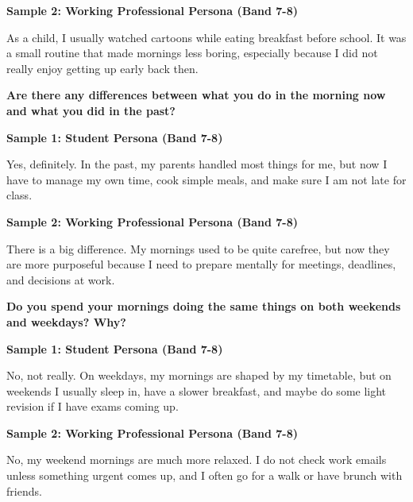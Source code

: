 \textbf{Sample 2: Working Professional Persona (Band 7-8)}

As a child, I usually watched cartoons while eating breakfast before school. It was a small routine that made mornings less boring, especially because I did not really enjoy getting up early back then.

\separator

\begin{ieltsquestion}
\textbf{Are there any differences between what you do in the morning now and what you did in the past?}
\end{ieltsquestion}
\textbf{Sample 1: Student Persona (Band 7-8)}

Yes, definitely. In the past, my parents handled most things for me, but now I have to manage my own time, cook simple meals, and make sure I am not late for class.

\textbf{Sample 2: Working Professional Persona (Band 7-8)}

There is a big difference. My mornings used to be quite carefree, but now they are more purposeful because I need to prepare mentally for meetings, deadlines, and decisions at work.

\separator

\begin{ieltsquestion}
\textbf{Do you spend your mornings doing the same things on both weekends and weekdays? Why?}
\end{ieltsquestion}
\textbf{Sample 1: Student Persona (Band 7-8)}

No, not really. On weekdays, my mornings are shaped by my timetable, but on weekends I usually sleep in, have a slower breakfast, and maybe do some light revision if I have exams coming up.

\textbf{Sample 2: Working Professional Persona (Band 7-8)}

No, my weekend mornings are much more relaxed. I do not check work emails unless something urgent comes up, and I often go for a walk or have brunch with friends.

\separator


